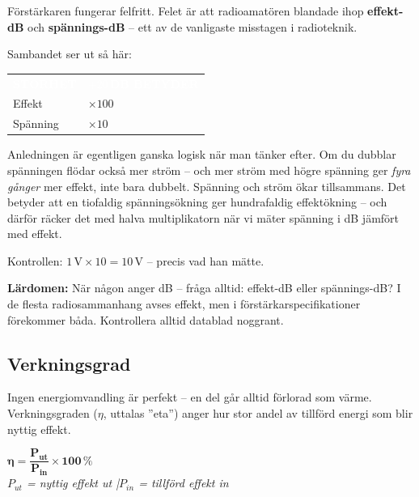 \documentclass[a4paper,11pt,twoside]{book}
\newcommand{\tblhdr}[1]{\cellcolor{greydark}\textcolor{white}{\headingfont\bfseries\footnotesize\MakeUppercase{#1}}}
\begin{document}
\begin{worked}[title={Lösning -- Fallgropsfråga 1.3.2\,F}]
Förstärkaren fungerar felfritt. Felet är att radioamatören 
blandade ihop \textbf{effekt-dB} och \textbf{spännings-dB} --
ett av de vanligaste misstagen i radioteknik.

Sambandet ser ut så här:
\begin{center}
\begin{tabular}{ll}
\rowcolor{greydark}
\tblhdr{Storhet} & \tblhdr{$+20$\,dB betyder} \\
Effekt & $\times 100$ \\
\rowcolor{greylight}
Spänning & $\times 10$ \\
\end{tabular}
\end{center}

Anledningen är egentligen ganska logisk när man tänker efter. 
Om du dubblar spänningen flödar också mer ström -- och mer 
ström med högre spänning ger \emph{fyra gånger} mer effekt, 
inte bara dubbelt. Spänning och ström ökar tillsammans. 
Det betyder att en tiofaldig spänningsökning ger hundrafaldig 
effektökning -- och därför räcker det med halva multiplikatorn 
när vi mäter spänning i dB jämfört med effekt.

Kontrollen: $1\,\text{V} \times 10 = 10\,\text{V}$ -- 
precis vad han mätte. \checkmark

\textbf{Lärdomen:} När någon anger dB -- fråga alltid: 
effekt-dB eller spännings-dB? I de flesta radiosammanhang 
avses effekt, men i förstärkarspecifikationer förekommer 
båda. Kontrollera alltid datablad noggrant.
\end{worked}

\subsection{Verkningsgrad}

Ingen energiomvandling är perfekt – en del går alltid förlorad som värme. Verkningsgraden ($\eta$, uttalas ''eta'') anger hur stor andel av tillförd energi som blir nyttig effekt.

\begin{formulabox}
{\large$\mathbf{\eta = \dfrac{P_{ut}}{P_{in}} \times 100\,\%}$}\\[3mm]
{\small\normalfont\itshape $P_{ut}$ = nyttig effekt ut \quad|\quad $P_{in}$ = tillförd effekt in}
\end{formulabox}
\end{document}
